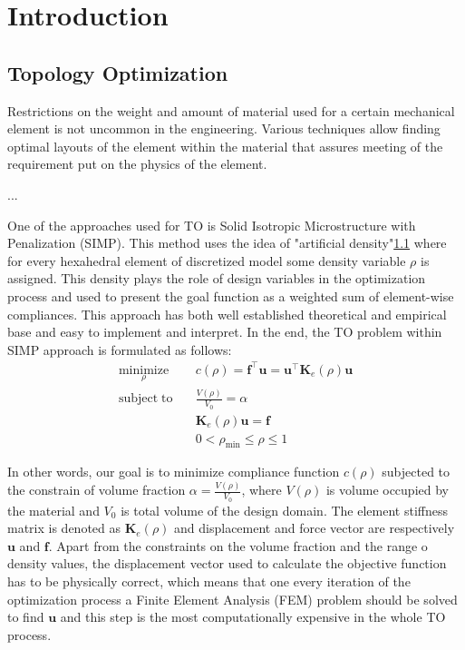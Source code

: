 
\chapter{Introduction}
\label{chapter:Introduction}

\section{Topology Optimization}

Restrictions on the weight and amount of material used for a certain mechanical element is not uncommon in the engineering.
Various techniques allow finding optimal layouts of the element within the material that assures meeting of the requirement put on the physics of the element. 

...

One of the approaches used for TO is Solid Isotropic Microstructure with Penalization (SIMP).
This method uses the idea of "artificial density"\ref{} where for every hexahedral element of discretized model some density variable $\rho$ is assigned.
This density plays the role of design variables in the optimization process and used to present the goal function as a weighted sum of element-wise compliances.
This approach has both well established theoretical and empirical base and easy to implement and interpret.
In the end, the TO problem within SIMP approach is formulated as follows:
	\begin{align*}
		\underset{\rho}{\mathrm{minimize}} \quad & c(\rho) = \mathbf{f}^\top \mathbf{u} = \mathbf{u}^\top \mathbf{K}_{e}(\rho) \mathbf{u} \\
		\mathrm{subject \; to} \quad & \frac{V(\rho)}{V_{0}} = \alpha \\
		& \mathbf{K}_{e}(\rho) \mathbf{u} = \mathbf{f} \\
		& 0 < \rho_{\min} \leq \rho \leq 1
	\end{align*} 

In other words, our goal is to minimize compliance function $c(\rho)$ subjected to the constrain of volume fraction $\alpha = \frac{V(\rho)}{V_{0}}$, where $V(\rho)$ is volume occupied by the material and $ V_{0} $ is total volume of the design domain.
The element stiffness matrix is denoted as $\mathbf{K}_{e}(\rho)$ and displacement and force vector are respectively $\mathbf{u}$ and $\mathbf{f}$.
Apart from the constraints on the volume fraction and the range o density values, the displacement vector used to calculate the objective function has to be physically correct, which means that one every iteration of the optimization process a Finite Element Analysis (FEM) problem should be solved to find $\mathbf{u}$ and this step is the most computationally expensive in the whole TO process.

